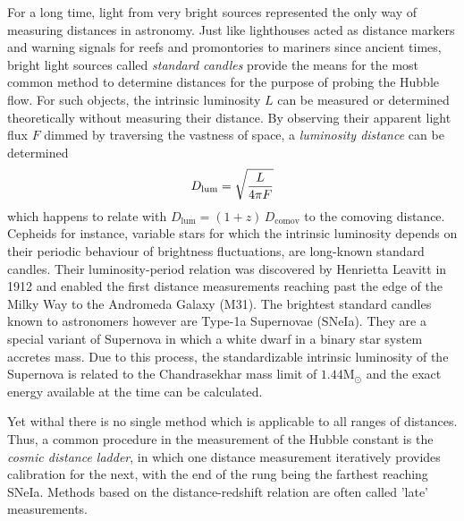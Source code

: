 For a long time, light from very bright sources represented the only way of
measuring distances in astronomy.  Just like lighthouses acted as
distance markers and warning signals for reefs and promontories to mariners
since ancient times, bright light sources called \textit{standard candles}
provide the means for the most common method to determine distances for the
purpose of probing the Hubble flow.  For such objects, the intrinsic luminosity
$L$ can be measured or determined theoretically without measuring their
distance.  By observing their apparent light flux $F$ dimmed by traversing the
vastness of space, a \textit{luminosity distance} can be determined
%
\begin{equation}\eqlbl{d_lum}%
    D_{\mathrm{lum}} = \sqrt{\frac{L}{4\pi F}}
\end{equation}%
%
which happens to relate with $D_{\mathrm{lum}}={(1+z)\,D_{\mathrm{comov}}}$ to the
comoving distance.  Cepheids for instance, variable stars for which
the intrinsic luminosity depends on their periodic behaviour of
brightness fluctuations, are long-known standard candles.  Their
luminosity-period relation was discovered by Henrietta Leavitt in 1912
and enabled the first distance measurements reaching past the edge of
the Milky Way to the Andromeda Galaxy (M31).  The brightest standard
candles known to astronomers however are Type-1a Supernovae (SNeIa).
They are a special variant of Supernova in which a white dwarf in a
binary star system accretes mass.  Due to this process, the
standardizable intrinsic luminosity of the Supernova is related to the
Chandrasekhar mass limit of $1.44\mathrm{M_\odot}$ and the exact energy
available at the time can be calculated.

Yet withal there is no single method which is applicable to all ranges of
distances.  Thus, a common procedure in the measurement of the Hubble constant
is the \textit{cosmic distance ladder}, in which one distance measurement
iteratively provides calibration for the next, with the end of the rung being
the farthest reaching SNeIa.  Methods based on the distance-redshift relation
are often called 'late' measurements.

